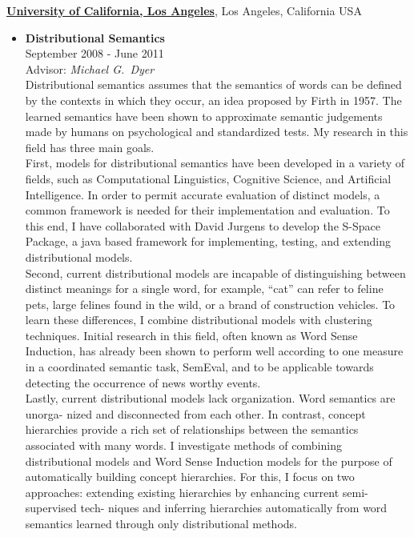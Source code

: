 \documentclass[10pt]{article}
\newenvironment{outerlist}[1][\enskip\textbullet]%
        {\begin{itemize}[#1,leftmargin=*]}{\end{itemize}%
         \vspace{-.6\baselineskip}}
\begin{document}
\href{http://www.cs.ucla.edu/}{\textbf{University of California, Los Angeles}},
Los Angeles, California USA
\begin{outerlist}

\item[] \textbf{Distributional Semantics} \\
        September 2008 - June 2011 \\
        Advisor: \textit{Michael G.~Dyer} \\

        Distributional semantics assumes that the semantics of words can be
        defined by the contexts in which they occur, an idea proposed by Firth
        in 1957. The learned semantics have been shown to approximate semantic
        judgements made by humans on psychological and standardized tests. My
        research in this field has three main goals. \\

        First, models for distributional semantics have been developed in a
        variety of fields, such as Computational Linguistics, Cognitive Science,
        and Artificial Intelligence. In order to permit accurate evaluation of
        distinct models, a common framework is needed for their implementation
        and evaluation. To this end, I have collaborated with David Jurgens to
        develop the S-Space Package, a java based framework for implementing,
        testing, and extending distributional models. \\

        Second, current distributional models are incapable of distinguishing
        between distinct meanings for a single word, for example, “cat” can
        refer to feline pets, large felines found in the wild, or a brand of
        construction vehicles. To learn these differences, I combine
        distributional models with clustering techniques. Initial research in
        this field, often known as Word Sense Induction, has already been shown
        to perform well according to one measure in a coordinated semantic task,
        SemEval, and to be applicable towards detecting the occurrence of news
        worthy events. \\

        Lastly, current distributional models lack organization. Word semantics
        are unorga- nized and disconnected from each other. In contrast, concept
        hierarchies provide a rich set of relationships between the semantics
        associated with many words. I investigate methods of combining
        distributional models and Word Sense Induction models for the purpose of
        automatically building concept hierarchies. For this, I focus on two
        approaches: extending existing hierarchies by enhancing current
        semi-supervised tech- niques and inferring hierarchies automatically
        from word semantics learned through only distributional methods.

\end{outerlist}
\end{document}

